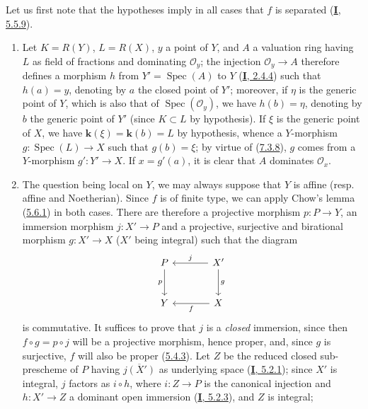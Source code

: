 Let us first note that the hypotheses imply in all cases that $f$ is
separated (\hyperref[I.5.5.9]{\textbf{I}, 5.5.9}).
\begin{enumerate}
\item[\rm (i)] Let $K=R(Y)$, $L=R(X)$, $y$ a point of $Y$, and $A$ a valuation
ring having $L$ as field of fractions and dominating
$\mathcal{O}_y$; the injection $\mathcal{O}_y\to A$ therefore defines a morphism
$h$ from $Y'=\operatorname{Spec}(A)$ to $Y$
(\hyperref[I.2.4.4]{\textbf{I}, 2.4.4}) such that $h(a)=y$, denoting by $a$ the
closed point of $Y'$; moreover, if $\eta$ is the generic point of $Y$, which
is also that of $\operatorname{Spec}(\mathcal{O}_y)$, we have $h(b)=\eta$,
denoting by $b$ the generic point of $Y'$ (since $K\subset L$ by
hypothesis). If $\xi$ is the generic point of $X$, we have $\boldsymbol{k}(\xi)=\boldsymbol{k}(b)=L$ by
hypothesis, whence a $Y$-morphism $g:\operatorname{Spec}(L)\to X$ such that
$g(b)=\xi$; by virtue of (\hyperref[II.7.3.8]{7.3.8}), $g$ comes from a
$Y$-morphism $g':Y'\to X$. If $x=g'(a)$, it is clear that $A$ dominates
$\mathcal{O}_x$.
\item[\rm (ii)] The question being local on $Y$, we may always suppose
that $Y$ is affine (resp. affine and Noetherian). Since $f$ is of finite type,
we can apply Chow's lemma (\hyperref[II.5.6.1]{5.6.1}) in both cases.
There are therefore a projective morphism
$p:P\to Y$, an immersion morphism $j:X'\to P$ and a projective,
surjective and birational morphism $g:X'\to X$ ($X'$ being integral) such that
the diagram
\[
\begin{tikzcd}[column sep=large,row sep=large]
P \arrow[d,"p"'] & X' \arrow[l,"j"'] \arrow[d,"g"] \\
Y & X \arrow[l,"f"]
\end{tikzcd}
\]
is commutative. It suffices to prove that $j$ is a \emph{closed} immersion,
since then $f\circ g=p\circ j$ will be a projective morphism, hence proper, and,
since $g$ is surjective, $f$ will also be proper
(\hyperref[II.5.4.3]{5.4.3}). Let $Z$ be the reduced closed sub-prescheme of
$P$ having $\overline{j(X')}$ as underlying space
(\hyperref[I.5.2.1]{\textbf{I}, 5.2.1}); since $X'$ is integral, $j$ factors
as $i\circ h$, where $i:Z\to P$ is the canonical injection and $h:X'\to Z$ a
dominant open immersion (\hyperref[I.5.2.3]{\textbf{I}, 5.2.3}), and $Z$ is
integral;


\end{enumerate}
